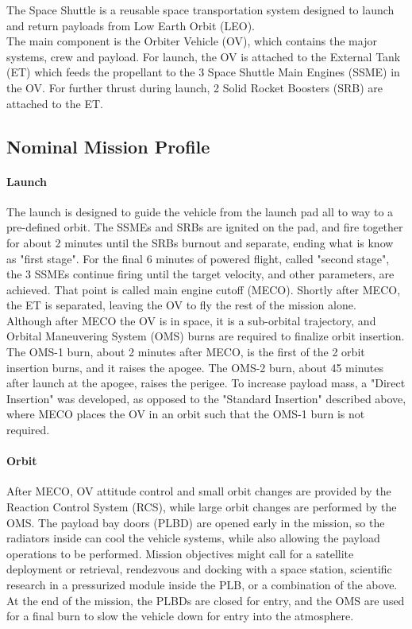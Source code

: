 \documentclass[Space_Shuttle_Vessel_Manual.tex]{subfiles}
\begin{document}
\begin{multicols*}{2}
The Space Shuttle is a reusable space transportation system designed to launch and return payloads from Low Earth Orbit (LEO).\\
The main component is the Orbiter Vehicle (OV), which contains the major systems, crew and payload. For launch, the OV is attached to the External Tank (ET) which feeds the propellant to the 3 Space Shuttle Main Engines (SSME) in the OV. For further thrust during launch, 2 Solid Rocket Boosters (SRB) are attached to the ET.\\


\newpage

\subsection{Nominal Mission Profile}
\paragraph{Launch}
The launch is designed to guide the vehicle from the launch pad all to way to a pre-defined orbit. The SSMEs and SRBs are ignited on the pad, and fire together for about 2 minutes until the SRBs burnout and separate, ending what is know as "first stage". For the final 6 minutes of powered flight, called "second stage", the 3 SSMEs continue firing until the target velocity, and other parameters, are achieved. That point is called main engine cutoff (MECO). Shortly after MECO, the ET is separated, leaving the OV to fly the rest of the mission alone.\\
Although after MECO the OV is in space, it is a sub-orbital trajectory, and Orbital Maneuvering System (OMS) burns are required to finalize orbit insertion. The OMS-1 burn, about 2 minutes after MECO, is the first of the 2 orbit insertion burns, and it raises the apogee. The OMS-2 burn, about 45 minutes after launch at the apogee, raises the perigee. To increase payload mass, a "Direct Insertion" was developed, as opposed to the "Standard Insertion" described above, where MECO places the OV in an orbit such that the OMS-1 burn is not required.

\paragraph{Orbit}
After MECO, OV attitude control and small orbit changes are provided by the Reaction Control System (RCS), while large orbit changes are performed by the OMS.
The payload bay doors (PLBD) are opened early in the mission, so the radiators inside can cool the vehicle systems, while also allowing the payload operations to be performed. Mission objectives might call for a satellite deployment or retrieval, rendezvous and docking with a space station, scientific research in a pressurized module inside the PLB, or a combination of the above.
At the end of the mission, the PLBDs are closed for entry, and the OMS are used for a final burn to slow the vehicle down for entry into the atmosphere.


\end{multicols*}
\end{document}
